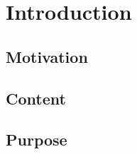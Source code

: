 \chapter{Introduction}
\label{cha:Einleitung}

\section{Motivation}

\section{Content}

\section{Purpose}